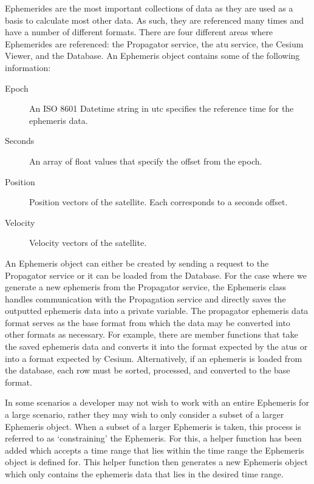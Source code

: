 Ephemerides are the most important collections of data as they are used as a
basis to calculate most other data. As such, they are referenced many times and
have a number of different formats. There are four different areas where
Ephemerides are referenced: the Propagator service, the \gls{atu} service, the
Cesium Viewer, and the Database. An Ephemeris object contains some of the
following information:

\begin{description}

    \item[Epoch] An ISO 8601 Datetime string in \gls{utc} specifies the
	reference time for the ephemeris data.

    \item[Seconds] An array of float values that specify the offset from the
	epoch.

    \item[Position] Position vectors of the satellite. Each corresponds to a
	seconds offset.

    \item[Velocity] Velocity vectors of the satellite. 


\end{description}


An Ephemeris object can either be created by sending a request to the
Propagator service or it can be loaded from the Database. For the case where we
generate a new ephemeris from the Propagator service, the Ephemeris class
handles communication with the Propagation service and directly saves the
outputted ephemeris data into a private variable. The propagator ephemeris data
format serves as the base format from which the data may be converted into
other formats as necessary.  For example, there are member functions that take
the saved ephemeris data and converts it into the format expected by the
\glspl{atu} or into a format expected by Cesium. Alternatively, if an ephemeris
is loaded from the database, each row must be sorted, processed, and converted
to the base format. 

In some scenarios a developer may not wish to work with an entire Ephemeris for
a large scenario, rather they may wish to only consider a subset of a larger
Ephemeris object. When a subset of a larger Ephemeris is taken, this process is
referred to as `constraining' the Ephemeris. For this, a helper function has
been added which accepts a time range that lies within the time range the
Ephemeris object is defined for. This helper function then generates a new
Ephemeris object which only contains the ephemeris data that lies in the
desired time range.  

